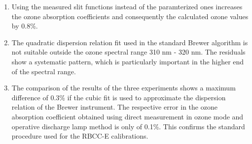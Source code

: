 \documentclass[acp, manuscript]{copernicus}
\begin{document}
\begin{enumerate}


    \item Using the measured slit functions instead of the paramterized ones increases the ozone absorption coefficients and consequently the calculated ozone values by 0.8\%.

    \item The quadratic dispersion relation fit used in the standard Brewer algorithm is not suitable outside the ozone spectral range 310 \unit{nm} - 320 \unit{nm}. The residuals show a systematic pattern, which is particularly important in the higher end of the spectral range.%

    \item The comparison of the results of the three experiments shows a maximum difference of 0.3\% if the cubic fit is used to approximate the dispersion relation of the Brewer instrument. The respective error in the ozone absorption coefficient obtained using direct measurement in ozone mode and operative discharge lamp method is only of 0.1\%. This confirms the standard procedure used for the RBCC-E calibrations.

\end{enumerate}









\end{document}
